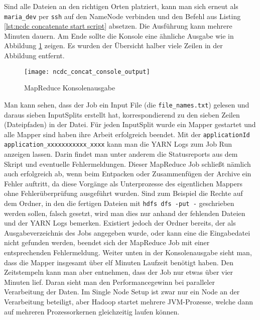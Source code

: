 

Sind alle Dateien an den richtigen Orten platziert, kann man sich erneut als \verb|maria_dev| per \verb|ssh| auf den NameNode verbinden und den Befehl aus Listing \ref{lst:ncdc concatenate start script} absetzen. Die Ausführung kann mehrere Minuten dauern. Am Ende sollte die Konsole eine ähnliche Ausgabe wie in Abbildung \ref{fig:ncdc concat console output} zeigen. Es wurden der Übersicht halber viele Zeilen in der Abbildung entfernt. 

\begin{figure}[ht]
    \centering
    \texttt{[image: ncdc\_concat\_console\_output]}
    \caption[MapReduce Konsolenausgabe]{MapReduce Konsolenausgabe}
    \label{fig:ncdc concat console output}
\end{figure}

Man kann sehen, dass der Job ein Input File (die \verb|file_names.txt|) gelesen und daraus sieben InputSplits erstellt hat, korrespondierend zu den sieben Zeilen (Dateipfaden) in der Datei. Für jeden InputSplit wurde ein Mapper gestartet und alle Mapper sind haben ihre Arbeit erfolgreich beendet. Mit der \verb|applicationId| \verb|application_xxxxxxxxxxx_xxxx| kann man die YARN Logs zum Job Run anzeigen lassen. Darin findet man unter anderem die Statusreports aus dem Skript und eventuelle Fehlermeldungen. Dieser MapReduce Job schließt nämlich auch erfolgreich ab, wenn beim Entpacken oder Zusammenfügen der Archive ein Fehler auftritt, da diese Vorgänge als Unterprozesse des eigentlichen Mappers ohne Fehlerüberprüfung ausgeführt wurden. Sind zum Beispiel die Rechte auf dem Ordner, in den die fertigen Dateien mit \verb|hdfs dfs -put -| geschrieben werden sollen, falsch gesetzt, wird man dies nur anhand der fehlenden Dateien und der YARN Logs bemerken. Existiert jedoch der Ordner bereits, der als Ausgabeverzeichnis des Jobs angegeben wurde, oder kann eine die Eingabedatei nicht gefunden werden, beendet sich der MapReduce Job mit einer entsprechenden Fehlermeldung. Weiter unten in der Konsolenausgabe sieht man, dass die Mapper insgesamt über elf Minuten Laufzeit benötigt haben. Den Zeitstempeln kann man aber entnehmen, dass der Job nur etwas über vier Minuten lief. Daran sieht man den Performancegewinn bei paralleler Verarbeitung der Daten. Im Single Node Setup ist zwar nur ein Node an der Verarbeitung beteiligt, aber Hadoop startet mehrere JVM-Prozesse, welche dann auf mehreren Prozessorkernen gleichzeitig laufen können.

